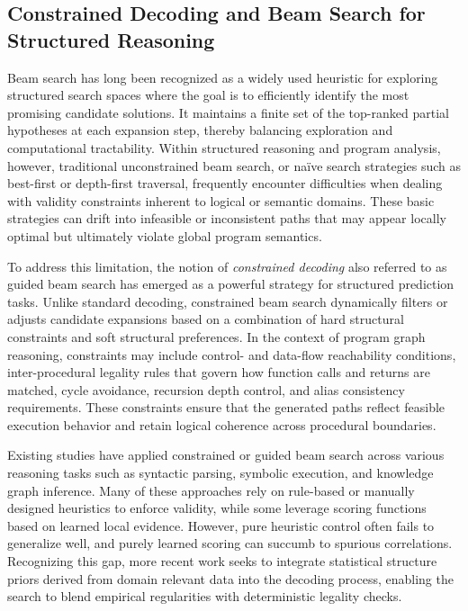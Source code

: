 \documentclass{buthesis}
\begin{document}
\subsection{Constrained Decoding and Beam Search for Structured Reasoning}
\label{sec:rw-constrained-beam}

Beam search has long been recognized as a widely used heuristic for exploring structured search spaces where the goal is to efficiently identify the most promising candidate solutions. It maintains a finite set of the top-ranked partial hypotheses at each expansion step, thereby balancing exploration and computational tractability. Within structured reasoning and program analysis, however, traditional unconstrained beam search, or naïve search strategies such as best-first or depth-first traversal, frequently encounter difficulties when dealing with validity constraints inherent to logical or semantic domains. These basic strategies can drift into infeasible or inconsistent paths that may appear locally optimal but ultimately violate global program semantics.

To address this limitation, the notion of \emph{constrained decoding} also referred to as guided beam search has emerged as a powerful strategy for structured prediction tasks. Unlike standard decoding, constrained beam search dynamically filters or adjusts candidate expansions based on a combination of hard structural constraints and soft structural preferences. In the context of program graph reasoning, constraints may include control- and data-flow reachability conditions, inter-procedural legality rules that govern how function calls and returns are matched, cycle avoidance, recursion depth control, and alias consistency requirements. These constraints ensure that the generated paths reflect feasible execution behavior and retain logical coherence across procedural boundaries.

Existing studies have applied constrained or guided beam search across various reasoning tasks such as syntactic parsing, symbolic execution, and knowledge graph inference. Many of these approaches rely on rule-based or manually designed heuristics to enforce validity, while some leverage scoring functions based on learned local evidence. However, pure heuristic control often fails to generalize well, and purely learned scoring can succumb to spurious correlations. Recognizing this gap, more recent work seeks to integrate statistical structure priors derived from domain relevant data into the decoding process, enabling the search to blend empirical regularities with deterministic legality checks.
\end{document}

